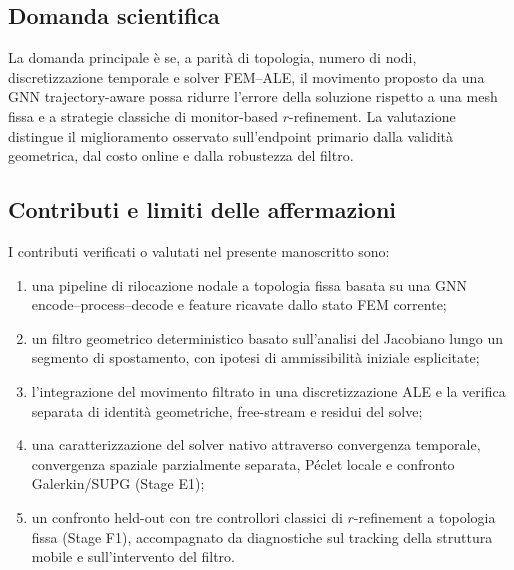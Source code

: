 \subsection{Domanda scientifica}

La domanda principale è se, a parità di topologia, numero di nodi, discretizzazione temporale e solver FEM--ALE, il movimento proposto da una GNN trajectory-aware possa ridurre l'errore della soluzione rispetto a una mesh fissa e a strategie classiche di monitor-based $r$-refinement. La valutazione distingue il miglioramento osservato sull'endpoint primario dalla validità geometrica, dal costo online e dalla robustezza del filtro.

\subsection{Contributi e limiti delle affermazioni}

I contributi verificati o valutati nel presente manoscritto sono:
\begin{enumerate}
  \item una pipeline di rilocazione nodale a topologia fissa basata su una GNN encode--process--decode e feature ricavate dallo stato FEM corrente;
  \item un filtro geometrico deterministico basato sull'analisi del Jacobiano lungo un segmento di spostamento, con ipotesi di ammissibilità iniziale esplicitate;
  \item l'integrazione del movimento filtrato in una discretizzazione ALE e la verifica separata di identità geometriche, free-stream e residui del solve;
  \item una caratterizzazione del solver nativo attraverso convergenza temporale, convergenza spaziale parzialmente separata, Péclet locale e confronto Galerkin/SUPG (Stage E1);
  \item un confronto held-out con tre controllori classici di $r$-refinement a topologia fissa (Stage F1), accompagnato da diagnostiche sul tracking della struttura mobile e sull'intervento del filtro.
\end{enumerate}
